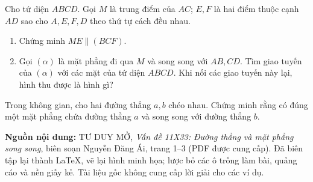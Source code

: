 \documentclass[11pt,a4paper]{article}
\newcommand{\sectitle}[2]{\vspace{3pt}\noindent{\large\bfseries\textcolor{questionpurple}{#1.\ #2}}\par\vspace{2pt}}
\newcommand{\exampletitle}[2]{\vspace{2pt}\noindent{\bfseries\textcolor{answerblue}{Ví dụ #1.}} #2\par\vspace{1pt}}
\newcommand{\drawpoint}[3]{\fill[answerblue] (#1) circle (1.35pt) node[#2] {$#3$};}
\begin{document}
\sectitle{3}{Ví dụ vận dụng}

\exampletitle{01 [TDM31]}{Cho tứ diện $ABCD$. Gọi $M$ là trung điểm của $AC$;
$E,F$ là hai điểm thuộc cạnh $AD$ sao cho $A,E,F,D$ theo thứ tự cách đều nhau.}
\begin{enumerate}
  \item Chứng minh $ME\parallel(BCF)$.
  \item Gọi $(\alpha)$ là mặt phẳng đi qua $M$ và song song với
  $AB,CD$. Tìm giao tuyến của $(\alpha)$ với các mặt của tứ diện $ABCD$.
  Khi nối các giao tuyến này lại, hình thu được là hình gì?
\end{enumerate}
\begin{center}
\end{center}

\exampletitle{02 [TDM32]}{Trong không gian, cho hai đường thẳng
$a,b$ chéo nhau. Chứng minh rằng có đúng một mặt phẳng chứa
đường thẳng $a$ và song song với đường thẳng $b$.}

\begin{tcolorbox}[colback=white,colframe=black!35,boxrule=.4pt,arc=0mm,
 left=2mm,right=2mm,top=1mm,bottom=1mm,before skip=3pt]
\footnotesize
\textbf{Nguồn nội dung:} TƯ DUY MỞ, \emph{Vấn đề 11X33:
Đường thẳng và mặt phẳng song song}, biên soạn Nguyễn Đăng Ái, trang 1--3
(PDF được cung cấp). Đã biên tập lại thành LaTeX, vẽ lại hình minh họa;
lược bỏ các ô trống làm bài, quảng cáo và nền giấy kẻ.
Tài liệu gốc không cung cấp lời giải cho các ví dụ.
\end{tcolorbox}
\end{document}
